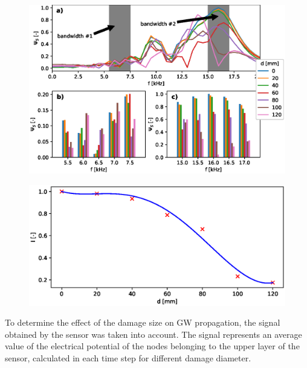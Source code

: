 \documentclass[materials,article,submit,moreauthors,pdftex]{Definitions/mdpi}
\providecommand{\DIFadd}[1]{{\protect\color{blue}{#1}}} %
\providecommand{\DIFaddbegin}{} %
\providecommand{\DIFaddend}{} %
\providecommand{\DIFdelend}{} %
\providecommand{\DIFaddFL}[1]{\DIFadd{#1}} %
\begin{document}
\DIFdelend \DIFaddbegin \begin{figure}
	\begin{center}
		\includegraphics[width=1\linewidth]{../../figures/eps/mgntPhiFFT.eps}
	\end{center}
	\caption{\DIFaddFL{The sensor signal in frequency domain a) full excitation bandwidth, b) bandwidth \#1, c) bandwidth \#2}}
	\label{fig:signals}
\end{figure}
\begin{figure}[H]
	\begin{center}
		\includegraphics[width=1\linewidth]{../../figures/eps/madif.eps}
	\end{center}
	\caption{\DIFaddFL{Model-assisted damage identify function for 16.5 kHz}}
	\label{fig:madif}
\end{figure}
\DIFaddend To determine the effect of the damage size on GW propagation, the signal obtained by the sensor was taken into account.
The signal represents an average value of the electrical potential of the nodes belonging to the upper layer of the sensor, calculated in each time step for different damage diameter.
\end{document}
